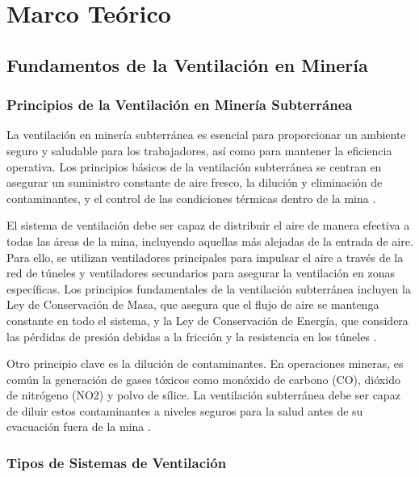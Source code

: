 \chapter{Marco Teórico}

\section{Fundamentos de la Ventilación en Minería}

\subsection{Principios de la Ventilación en Minería Subterránea}

La ventilación en minería subterránea es esencial para proporcionar un ambiente seguro y saludable para los trabajadores, así como para mantener la eficiencia operativa. Los principios básicos de la ventilación subterránea se centran en asegurar un suministro constante de aire fresco, la dilución y eliminación de contaminantes, y el control de las condiciones térmicas dentro de la mina \cite{mcpherson1993subsurface}. 

El sistema de ventilación debe ser capaz de distribuir el aire de manera efectiva a todas las áreas de la mina, incluyendo aquellas más alejadas de la entrada de aire. Para ello, se utilizan ventiladores principales para impulsar el aire a través de la red de túneles y ventiladores secundarios para asegurar la ventilación en zonas específicas. Los principios fundamentales de la ventilación subterránea incluyen la Ley de Conservación de Masa, que asegura que el flujo de aire se mantenga constante en todo el sistema, y la Ley de Conservación de Energía, que considera las pérdidas de presión debidas a la fricción y la resistencia en los túneles \cite{hartman1997mine}.

Otro principio clave es la dilución de contaminantes. En operaciones mineras, es común la generación de gases tóxicos como monóxido de carbono (CO), dióxido de nitrógeno (NO2) y polvo de sílice. La ventilación subterránea debe ser capaz de diluir estos contaminantes a niveles seguros para la salud antes de su evacuación fuera de la mina \cite{brune2008mine}.

\subsection{Tipos de Sistemas de Ventilación}

